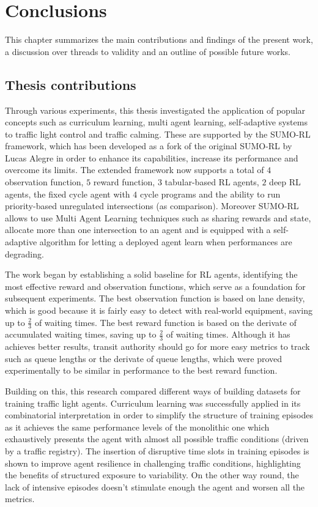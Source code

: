 \chapter{Conclusions}

This chapter summarizes the main contributions and findings of the present work, a discussion over threads to validity and an outline of possible future works.

\section{Thesis contributions}

Through various experiments, this thesis investigated the application of popular concepts such as curriculum learning, multi agent learning, self-adaptive systems to traffic light control and traffic calming.
These are supported by the SUMO-RL framework, which has been developed as a fork of the original SUMO-RL by Lucas Alegre in order to enhance its capabilities, increase its performance and overcome its limits.
The extended framework now supports a total of $4$ observation function, $5$ reward function, $3$ tabular-based RL agents, $2$ deep RL agents, the fixed cycle agent with $4$ cycle programs and the ability to run priority-based unregulated intersections (as comparison).
Moreover SUMO-RL allows to use Multi Agent Learning techniques such as sharing rewards and state, allocate more than one intersection to an agent and is equipped with a self-adaptive algorithm for letting a deployed agent learn when performances are degrading.

The work began by establishing a solid baseline for RL agents, identifying the most effective reward and observation functions, which serve as a foundation for subsequent experiments.
The best observation function is based on lane density, which is good because it is fairly easy to detect with real-world equipment, saving up to $\frac{2}{3}$ of waiting times.
The best reward function is based on the derivate of accumulated waiting times, saving up to $\frac{2}{3}$ of waiting times.
Although it has achieves better results, transit authority should go for more easy metrics to track such as queue lengths or the derivate of queue lengths, which were proved experimentally to be similar in performance to the best reward function.

Building on this, this research compared different ways of building datasets for training traffic light agents.
Curriculum learning was successfully applied in its combinatorial interpretation in order to simplify the structure of training episodes as it achieves the same performance levels of the monolithic one which exhaustively presents the agent with almost all possible traffic conditions (driven by a traffic registry).
The insertion of disruptive time slots in training episodes is shown to improve agent resilience in challenging traffic conditions, highlighting the benefits of structured exposure to variability.
On the other way round, the lack of intensive episodes doesn't stimulate enough the agent and worsen all the metrics.

